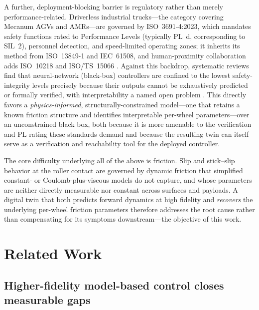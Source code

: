 \documentclass[11pt]{article}
\begin{document}
A further, deployment-blocking barrier is regulatory rather than merely
performance-related. Driverless industrial trucks---the category covering Mecanum
AGVs and AMRs---are governed by ISO~3691-4:2023, which mandates safety functions
rated to Performance Levels (typically PL~d, corresponding to SIL~2), personnel
detection, and speed-limited operating zones; it inherits its method from
ISO~13849-1 and IEC~61508, and human-proximity collaboration adds ISO~10218 and
ISO/TS~15066 \cite{iso3691_4,iso13849}. Against this backdrop, systematic reviews
find that neural-network (black-box) controllers are confined to the lowest safety-
integrity levels precisely because their outputs cannot be exhaustively predicted or
formally verified, with interpretability a named open problem
\cite{zhang2020nnverif,certifyml2022}. This directly favors a \emph{physics-informed},
structurally-constrained model---one that retains a known friction structure and
identifies interpretable per-wheel parameters---over an unconstrained black box, both
because it is more amenable to the verification and PL rating these standards demand
and because the resulting twin can itself serve as a verification and reachability
tool for the deployed controller.

The core difficulty underlying all of the above is friction. Slip and stick--slip
behavior at the roller contact are governed by dynamic friction that simplified
constant- or Coulomb-plus-viscous models do not capture, and whose parameters are
neither directly measurable nor constant across surfaces and payloads. A digital
twin that both predicts forward dynamics at high fidelity and \emph{recovers} the
underlying per-wheel friction parameters therefore addresses the root cause rather
than compensating for its symptoms downstream---the objective of this work.

\section{Related Work}
\label{sec:related}

\subsection{Higher-fidelity model-based control closes measurable gaps}
\label{sec:related-control}
\end{document}
